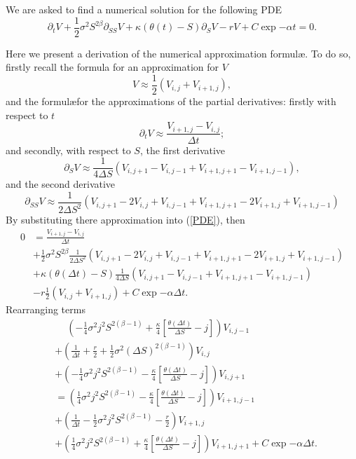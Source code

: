 We are asked to find a numerical solution for the following PDE
\begin{equation}\label{PDE}
	\partial_t V + \frac{1}{2}\sigma^2 S^{2\beta} \partial_{SS}V + \kappa(\theta(t) - S)\partial_S V - rV + C \exp{-\alpha t} = 0.
\end{equation}

Here we present a derivation of the numerical approximation formul\ae. To do so, firstly recall the formula for an approximation for $V$
\begin{equation}
		V \approx \frac{1}{2}\left(V_{i,j} + V_{i+1,j}\right),
\end{equation}
and the formul\ae for the approximations of the partial derivatives: firstly with respect to $t$
\begin{equation}\label{partial_wrt_t}
	\partial_t V \approx \frac{V_{i+1,j} - V_{i,j}}{\Delta t};
\end{equation}
and secondly, with respect to $S$, the first derivative
\begin{equation}\label{first_wrt_S}
	\partial_S V 	\approx \frac{1}{4\Delta S}\left(V_{i,j+1} - V_{i,j-1} + V_{i+1,j+1} - V_{i+1,j-1}\right),
\end{equation}
and the second derivative
\begin{equation}\label{second_wrt_S}
	\partial_{SS} V	\approx \frac{1}{2\Delta S^2}\left(V_{i,j+1} - 2V_{i,j } + V_{i,j-1}+ V_{i+1,j+1}-2V_{i+1,j} + V_{i+1,j-1}\right)
\end{equation}
By substituting there approximation into (\ref{PDE}), then
$$
	\begin{aligned}
		0 	&= \frac{V_{i+1,j} - V_{i,j}}{\Delta t} \\
			&+ \frac{1}{2}\sigma^2 S^{2\beta} \frac{1}{2\Delta S^2}\left(V_{i,j+1} - 2V_{i,j } + V_{i,j-1}+ V_{i+1,j+1}-2V_{i+1,j} + V_{i+1,j-1}\right) \\
			&+ \kappa(\theta(\Delta t) - S)\frac{1}{4\Delta S}\left(V_{i,j+1} - V_{i,j-1} + V_{i+1,j+1} - V_{i+1,j-1}\right) \\
			&- r\frac{1}{2}\left(V_{i,j} + V_{i+1,j}\right) + C \exp{-\alpha \Delta t}.
	\end{aligned}
$$
Rearranging terms
$$
	\begin{aligned}
		&\phantom{+} \left(-\frac{1}{4}\sigma^2j^2S^{2(\beta -1)}+ \frac{\kappa}{4}\left[\frac{\theta(\Delta t)}{\Delta S} - j\right]\right)V_{i,j-1} \\
		&+ \left(\frac{1}{\Delta t} + \frac{r}{2} + \frac{1}{2}\sigma^2 \left(\Delta S\right)^{2(\beta - 1)} \right)V_{i,j} \\
		&+ \left( -\frac{1}{4}\sigma^2j^2S^{2(\beta -1)} - \frac{\kappa}{4}\left[\frac{\theta(\Delta t)}{\Delta S} - j\right]\right) V_{i, j+1}\\
		&= \left(\frac{1}{4}\sigma^2 j^2S^{2(\beta - 1)} - \frac{\kappa}{4}\left[\frac{\theta(\Delta t)}{\Delta S} - j\right]\right)V_{i+1,j-1}\\
		&+ \left(\frac{1}{\Delta t } - \frac{1}{2}\sigma^2 j^2S^{2(\beta - 1)}  - \frac{r}{2}\right)V_{i+1,j}\\
		&+ \left(\frac{1}{4}\sigma^2 j^2S^{2(\beta - 1)}+ \frac{\kappa}{4}\left[\frac{\theta(\Delta t)}{\Delta S} - j\right]\right)V_{i+1,j+1} + C \exp{-\alpha \Delta t}.
	\end{aligned}
$$
